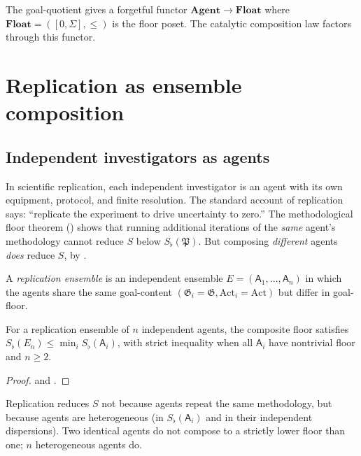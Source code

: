 \documentclass[11pt,twocolumn,a4paper]{article}
\newcommand{\Method}{\mathfrak{P}}
\newcommand{\Goal}{\mathfrak{G}}
\newcommand{\agent}{\mathsf{A}}
\newcommand{\Sfloor}{S_{\flat}}
\newcommand{\Action}{\mathrm{Act}}
\begin{document}
\begin{remark}\label{rem:cat-quot}
The goal-quotient gives a forgetful functor
$\mathbf{Agent}\to\mathbf{Float}$ where $\mathbf{Float}=([0,\Sigma],\le)$
is the floor poset. The catalytic composition law factors through
this functor.
\end{remark}

\section{Replication as ensemble composition}
\label{sec:replication}

\subsection{Independent investigators as agents}

In scientific replication, each independent investigator is an agent
with its own equipment, protocol, and finite resolution. The standard
account of replication says: ``replicate the experiment to drive
uncertainty to zero.'' The methodological floor theorem
() shows that running additional iterations of the
\emph{same} agent's methodology cannot reduce $S$ below
$\Sfloor(\Method)$. But composing \emph{different} agents
\emph{does} reduce $S$, by .

\begin{definition}\label{def:rep-ens}
A \emph{replication ensemble} is an independent ensemble
$E=(\agent_1,\dots,\agent_n)$ in which the agents share the same
goal-content $(\Goal_i=\Goal,\Action_i=\Action)$ but differ in
goal-floor.
\end{definition}

\begin{theorem}\label{thm:rep-red}
For a replication ensemble of $n$ independent agents, the
composite floor satisfies
$\Sfloor(E_n)\le\min_i\Sfloor(\agent_i)$, with strict inequality when
all $\agent_i$ have nontrivial floor and $n\ge 2$.
\end{theorem}

\begin{proof}
 and .
\end{proof}

\begin{corollary}\label{cor:het}
Replication reduces $S$ not because agents repeat the same
methodology, but because agents are heterogeneous (in
$\Sfloor(\agent_i)$ and in their independent dispersions). Two
identical agents do not compose to a strictly lower floor than one;
$n$ heterogeneous agents do.
\end{corollary}
\end{document}
